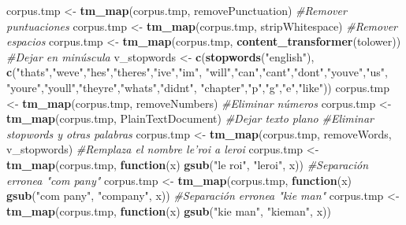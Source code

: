 \documentclass[
]{article}
\newenvironment{Shaded}{\begin{snugshade}}{\end{snugshade}}
\newcommand{\CommentTok}[1]{\textcolor[rgb]{0.56,0.35,0.01}{\textit{#1}}}
\newcommand{\ControlFlowTok}[1]{\textcolor[rgb]{0.13,0.29,0.53}{\textbf{#1}}}
\newcommand{\KeywordTok}[1]{\textcolor[rgb]{0.13,0.29,0.53}{\textbf{#1}}}
\newcommand{\NormalTok}[1]{#1}
\newcommand{\StringTok}[1]{\textcolor[rgb]{0.31,0.60,0.02}{#1}}
\begin{document}
\begin{Shaded}
\begin{Highlighting}[]
\NormalTok{  corpus.tmp <-}\StringTok{ }\KeywordTok{tm_map}\NormalTok{(corpus.tmp, removePunctuation) }\CommentTok{#Remover puntuaciones}
\NormalTok{  corpus.tmp <-}\StringTok{ }\KeywordTok{tm_map}\NormalTok{(corpus.tmp, stripWhitespace) }\CommentTok{#Remover espacios}
\NormalTok{  corpus.tmp <-}\StringTok{ }\KeywordTok{tm_map}\NormalTok{(corpus.tmp, }\KeywordTok{content_transformer}\NormalTok{(tolower)) }\CommentTok{#Dejar en minúscula}
\NormalTok{  v_stopwords <-}\StringTok{ }\KeywordTok{c}\NormalTok{(}\KeywordTok{stopwords}\NormalTok{(}\StringTok{"english"}\NormalTok{), }\KeywordTok{c}\NormalTok{(}\StringTok{"thats"}\NormalTok{,}\StringTok{"weve"}\NormalTok{,}\StringTok{"hes"}\NormalTok{,}\StringTok{"theres"}\NormalTok{,}\StringTok{"ive"}\NormalTok{,}\StringTok{"im"}\NormalTok{,}
                                           \StringTok{"will"}\NormalTok{,}\StringTok{"can"}\NormalTok{,}\StringTok{"cant"}\NormalTok{,}\StringTok{"dont"}\NormalTok{,}\StringTok{"youve"}\NormalTok{,}\StringTok{"us"}\NormalTok{,}
                                           \StringTok{"youre"}\NormalTok{,}\StringTok{"youll"}\NormalTok{,}\StringTok{"theyre"}\NormalTok{,}\StringTok{"whats"}\NormalTok{,}\StringTok{"didnt"}\NormalTok{,}
                                           \StringTok{"chapter"}\NormalTok{,}\StringTok{"p"}\NormalTok{,}\StringTok{"g"}\NormalTok{,}\StringTok{"e"}\NormalTok{,}\StringTok{"like"}\NormalTok{)) }
\NormalTok{  corpus.tmp <-}\StringTok{ }\KeywordTok{tm_map}\NormalTok{(corpus.tmp, removeNumbers) }\CommentTok{#Eliminar números}
\NormalTok{  corpus.tmp <-}\StringTok{ }\KeywordTok{tm_map}\NormalTok{(corpus.tmp, PlainTextDocument) }\CommentTok{#Dejar texto plano}
  \CommentTok{#Eliminar stopwords y otras palabras}
\NormalTok{  corpus.tmp <-}\StringTok{ }\KeywordTok{tm_map}\NormalTok{(corpus.tmp, removeWords, v_stopwords) }
  \CommentTok{#Remplaza el nombre le'roi a leroi}
\NormalTok{  corpus.tmp <-}\StringTok{ }\KeywordTok{tm_map}\NormalTok{(corpus.tmp, }\ControlFlowTok{function}\NormalTok{(x) }\KeywordTok{gsub}\NormalTok{(}\StringTok{"le roi"}\NormalTok{, }\StringTok{"leroi"}\NormalTok{, x)) }
  \CommentTok{#Separación erronea "com pany"}
\NormalTok{  corpus.tmp <-}\StringTok{ }\KeywordTok{tm_map}\NormalTok{(corpus.tmp, }\ControlFlowTok{function}\NormalTok{(x) }\KeywordTok{gsub}\NormalTok{(}\StringTok{"com pany"}\NormalTok{, }\StringTok{"company"}\NormalTok{, x))}
  \CommentTok{#Separación erronea "kie man"}
\NormalTok{  corpus.tmp <-}\StringTok{ }\KeywordTok{tm_map}\NormalTok{(corpus.tmp, }\ControlFlowTok{function}\NormalTok{(x) }\KeywordTok{gsub}\NormalTok{(}\StringTok{"kie man"}\NormalTok{, }\StringTok{"kieman"}\NormalTok{, x))}

\end{Highlighting}
\end{Shaded}
\end{document}
